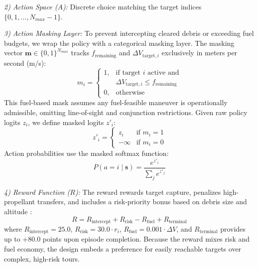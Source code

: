 \documentclass[10pt,conference,a4paper]{IEEEtran}
\begin{document}
\textit{2) Action Space ($A$):} Discrete choice matching the target indices $\{0, 1, \dots, N_{max}-1\}$.

\textit{3) Action Masking Layer:} To prevent intercepting cleared debris or exceeding fuel budgets, we wrap the policy \cite{schulman2017ppo} with a categorical masking layer. The masking vector $\mathbf{m} \in \{0, 1\}^{N_{max}}$ tracks $f_{\text{remaining}}$ and $\Delta V_{\text{target}, i}$ exclusively in meters per second (m/s):
{\small
\begin{equation}
m_i = \begin{cases} 
1, & \text{if target } i \text{ active and} \\
   & \Delta V_{\text{target}, i} \le f_{\text{remaining}} \\ 
0, & \text{otherwise} 
\end{cases}
\end{equation}
}
This fuel-based mask assumes any fuel-feasible maneuver is operationally admissible, omitting line-of-sight and conjunction restrictions. Given raw policy logits $z_i$, we define masked logits $z'_i$:
\begin{equation}
z'_i = \begin{cases} 
z_i & \text{if } m_i = 1 \\ 
-\infty & \text{if } m_i = 0 
\end{cases}
\end{equation}
Action probabilities use the masked softmax function:
\begin{equation}
P(a = i \mid \mathbf{s}) = \frac{e^{z'_i}}{\sum_j e^{z'_j}}
\end{equation}

\textit{4) Reward Function ($R$):} The reward rewards target capture, penalizes high-propellant transfers, and includes a risk-priority bonus based on debris size and altitude \cite{poupon2024}:
\begin{equation}
R = R_{\text{intercept}} + R_{\text{risk}} - R_{\text{fuel}} + R_{\text{terminal}}
\end{equation}
where $R_{\text{intercept}} = 25.0$, $R_{\text{risk}} = 30.0 \cdot r_i$, $R_{\text{fuel}} = 0.001 \cdot \Delta V$, and $R_{\text{terminal}}$ provides up to $+80.0$ points upon episode completion. Because the reward mixes risk and fuel economy, the design embeds a preference for easily reachable targets over complex, high-risk tours.
\end{document}
